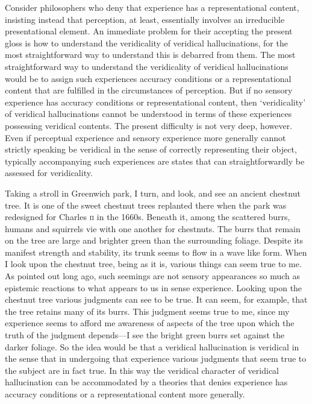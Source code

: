 \documentclass[12pt]{article}
\begin{document}
Consider philosophers who deny that experience has a representational content, insisting instead that perception, at least, essentially involves an irreducible presentational element. An immediate problem for their accepting the present gloss is how to understand the veridicality of veridical hallucinations, for the most straightforward way to understand this is debarred from them. The most straightforward way to understand the veridicality of veridical hallucinations would be to assign such experiences accuracy conditions or a representational content that are fulfilled in the circumstances of perception. But if no sensory experience has accuracy conditions or representational content, then `veridicality' of veridical hallucinations cannot be understood in terms of these experiences possessing veridical contents. The present difficulty is not very deep, however. Even if perceptual experience and sensory experience more generally cannot strictly speaking be veridical in the sense of correctly representing their object, typically accompanying such experiences are states that can straightforwardly be assessed for veridicality. 

Taking a stroll in Greenwich park, I turn, and look, and see an ancient chestnut tree. It is one of the sweet chestnut trees replanted there when the park was redesigned for Charles \textsc{ii} in the 1660s. Beneath it, among the scattered burrs, humans and squirrels vie with one another for chestnuts. The burrs that remain on the tree are large and brighter green than the surrounding foliage. Despite its manifest strength and stability, its trunk seems to flow in a wave like form. When I look upon the chestnut tree, being as it is, various things can seem true to me. As \citet{Price:1952ix} pointed out long ago, such seemings are not sensory appearances so much as epistemic reactions to what appears to us in sense experience. Looking upon the chestnut tree various judgments can see to be true. It can seem, for example, that the tree retains many of its burrs. This judgment seems true to me, since my experience seems to afford me awareness of aspects of the tree upon which the truth of the judgment depends---I see the bright green burrs set against the darker foliage. So the idea would be that a veridical hallucination is veridical in the sense that in undergoing that experience various judgments that seem true to the subject are in fact true. In this way the veridical character of veridical hallucination can be accommodated by a theories that denies experience has accuracy conditions or a representational content more generally.
\end{document}
